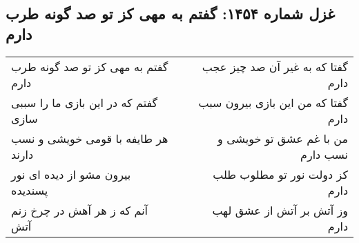 \begin{center}
\section*{غزل شماره ۱۴۵۴: گفتم به مهی کز تو صد گونه طرب دارم}
\label{sec:1454}
\begin{longtable}{l p{0.5cm} r}
گفتم به مهی کز تو صد گونه طرب دارم
&&
گفتا که به غیر آن صد چیز عجب دارم
\\
گفتم که در این بازی ما را سببی سازی
&&
گفتا که من این بازی بیرون سبب دارم
\\
هر طایفه با قومی خویشی و نسب دارند
&&
من با غم عشق تو خویشی و نسب دارم
\\
بیرون مشو از دیده ای نور پسندیده
&&
کز دولت نور تو مطلوب طلب دارم
\\
آنم که ز هر آهش در چرخ زنم آتش
&&
وز آتش بر آتش از عشق لهب دارم
\\
\end{longtable}
\end{center}
